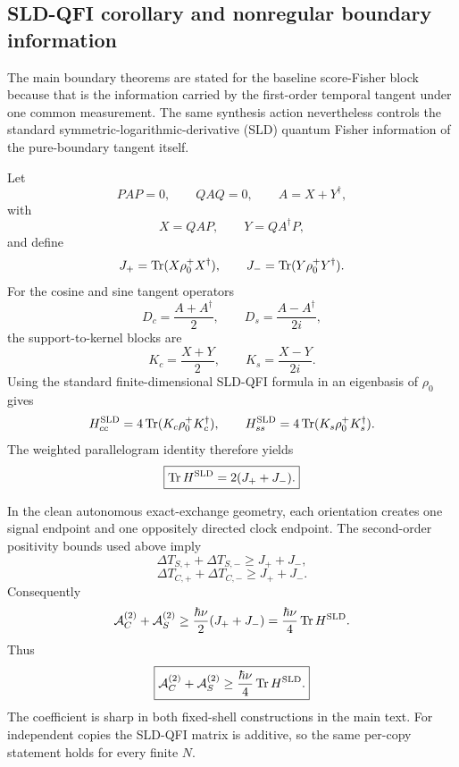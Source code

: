 \subsection{SLD-QFI corollary and nonregular boundary information}
\label{supp:qfi-nonregular}

The main boundary theorems are stated for the baseline score-Fisher block because that is the information carried by the first-order temporal tangent under one common measurement. The same synthesis action nevertheless controls the standard symmetric-logarithmic-derivative (SLD) quantum Fisher information of the pure-boundary tangent itself.

Let
\begin{equation}
PAP=0,\qquad QAQ=0,\qquad A=X+Y^\dagger,
\end{equation}
with
\begin{equation}
X=QAP,\qquad Y=QA^\dagger P,
\end{equation}
and define
\begin{equation}
J_+=\operatorname{Tr}(X\rho_0^+X^\dagger),\qquad
J_-=\operatorname{Tr}(Y\rho_0^+Y^\dagger).
\end{equation}
For the cosine and sine tangent operators
\begin{equation}
D_c=\frac{A+A^\dagger}{2},\qquad
D_s=\frac{A-A^\dagger}{2i},
\end{equation}
the support-to-kernel blocks are
\begin{equation}
K_c=\frac{X+Y}{2},\qquad
K_s=\frac{X-Y}{2i}.
\end{equation}
Using the standard finite-dimensional SLD-QFI formula in an eigenbasis of $\rho_0$ gives
\begin{equation}
H^{\rm SLD}_{cc}=4\operatorname{Tr}(K_c\rho_0^+K_c^\dagger),\qquad
H^{\rm SLD}_{ss}=4\operatorname{Tr}(K_s\rho_0^+K_s^\dagger).
\end{equation}
The weighted parallelogram identity therefore yields
\begin{equation}
\boxed{
\operatorname{Tr} H^{\rm SLD}=2(J_++J_-).
}
\label{eq:sld-trace-pure-boundary}
\end{equation}

In the clean autonomous exact-exchange geometry, each orientation creates one signal endpoint and one oppositely directed clock endpoint. The second-order positivity bounds used above imply
\begin{equation}
\Delta T_{S,+}+\Delta T_{S,-}\ge J_++J_-,
\end{equation}
\begin{equation}
\Delta T_{C,+}+\Delta T_{C,-}\ge J_++J_-.
\end{equation}
Consequently
\begin{equation}
\mathcal A_C^{(2)}+\mathcal A_S^{(2)}
\ge\frac{\hbar\nu}{2}(J_++J_-)
=\frac{\hbar\nu}{4}\operatorname{Tr} H^{\rm SLD}.
\end{equation}
Thus
\begin{equation}
\boxed{
\mathcal A_C^{(2)}+\mathcal A_S^{(2)}
\ge\frac{\hbar\nu}{4}\operatorname{Tr} H^{\rm SLD}.
}
\label{eq:sld-action-corollary}
\end{equation}
The coefficient is sharp in both fixed-shell constructions in the main text. For independent copies the SLD-QFI matrix is additive, so the same per-copy statement holds for every finite $N$.

